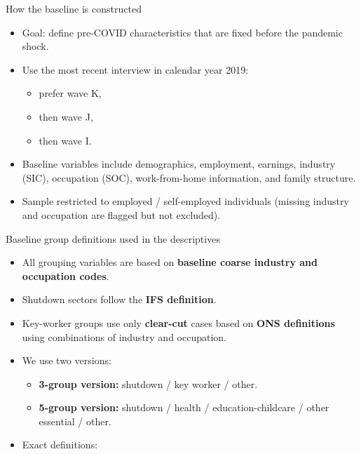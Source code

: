 \documentclass[aspectratio=169,11pt]{beamer}
\begin{document}
\begin{frame}{How the baseline is constructed}
\begin{itemize}
  \item Goal: define pre-COVID characteristics that are fixed before the pandemic shock.
  \item Use the most recent interview in calendar year 2019:
    \begin{itemize}
      \item prefer wave K,
      \item then wave J,
      \item then wave I.
    \end{itemize}
  \item Baseline variables include demographics, employment, earnings, industry (SIC), occupation (SOC), work-from-home information, and family structure.
  \item Sample restricted to employed / self-employed individuals (missing industry and occupation are flagged but not excluded).
\end{itemize}
\end{frame}

\begin{frame}{Baseline group definitions used in the descriptives} \label{group_defs}
\begin{itemize}
  \item All grouping variables are based on \textbf{baseline coarse industry and occupation codes}.
  \item Shutdown sectors follow the \textbf{IFS definition}.
  \item Key-worker groups use only \textbf{clear-cut} cases based on \textbf{ONS definitions} using combinations of industry and occupation.
  \item We use two versions:
    \begin{itemize}
      \item \textbf{3-group version:} shutdown / key worker / other.
      \item \textbf{5-group version:} shutdown / health / education-childcare / other essential / other.
    \end{itemize}
  \item Exact definitions:
    \hyperlink{ifs-shutdown-sec}{}
    \hyperlink{health-keyworker-sec}{}
    \hyperlink{edu-keyworker-sec}{}
    \hyperlink{other-keyworker-sec}{}
\end{itemize}
\end{frame}
\end{document}
